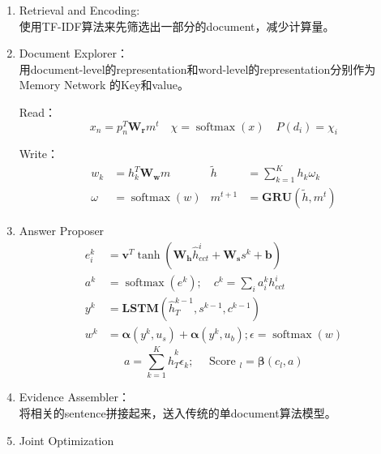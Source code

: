\documentclass[a4paper,UTF8]{article}
\numberwithin{equation}{section}
\begin{document}
\begin{enumerate}
	\item  Retrieval and Encoding:\\使用TF-IDF算法来先筛选出一部分的document，减少计算量。
	\item  Document Explorer：\\用document-level的representation和word-level的representation分别作为Memory Network
	的Key和value。

	Read：\begin{equation}
		x_{n}=p_{n}^{T} \mathbf{W}_{\mathbf{r}} m^{t} \quad \chi=\operatorname{softmax}(x) \quad P\left(d_{i}\right)=\chi_{i}
		\end{equation}
	
	Write：\begin{equation}
	\begin{array}{rlrl}{w_{k}} & {=h_{k}^{T} \mathbf{W}_{\mathbf{w}} m} & {\tilde{h}} & {=\sum_{k=1}^{K} h_{k} \omega_{k}} \\ {\omega} & {=\operatorname{softmax}(w)} & {m^{t+1}} & {=\mathbf{G} \mathbf{R} \mathbf{U}\left(\tilde{h}, m^{t}\right)}\end{array}
	\end{equation}
	\item  Answer Proposer
	\begin{equation}
	\begin{aligned} e_{i}^{k} &=\mathbf{v}^{T} \tanh \left(\mathbf{W}_{\mathbf{h}} \hat{h}_{c c t}^{i}+\mathbf{W}_{\mathbf{s}} s^{k}+\mathbf{b}\right) \\ a^{k} &=\operatorname{softmax}\left(e^{k}\right) ; \quad c^{k}=\sum_{i} a_{i}^{k} h_{c c t}^{i} \\ y^{k} &=\mathbf{L} \mathbf{S} \mathbf{T} \mathbf{M}\left(\hat{h}_{T}^{k-1}, s^{k-1}, c^{k-1}\right) \\ w^{k} &=\boldsymbol{\alpha}\left(y^{k}, u_{s}\right)+\boldsymbol{\alpha}\left(y^{k}, u_{b}\right) ; \epsilon=\operatorname{softmax}(w) \end{aligned}
	\end{equation}
	\begin{equation}
		a=\sum_{k=1}^{K} \hat{h}_{T}^{k} \epsilon_{k} ; \quad \text { Score }_{l}=\boldsymbol{\beta}\left(c_{l}, a\right)
		\end{equation}
	\item  Evidence Assembler：\\将相关的sentence拼接起来，送入传统的单document算法模型。
	\item  Joint Optimization
\end{enumerate}
\newpage
\end{document}
